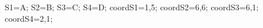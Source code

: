\documentclass[exercice]{thedocument}%
\begin{document}
%
    \>S1=A;%
    \>S2=B;%
    \>S3=C;%
    \>S4=D;%
    \>coordS1=1,5;%
    \>coordS2=6,6;%
    \>coordS3=6,1;%
    \>coordS4=2,1;%
\end{document}
